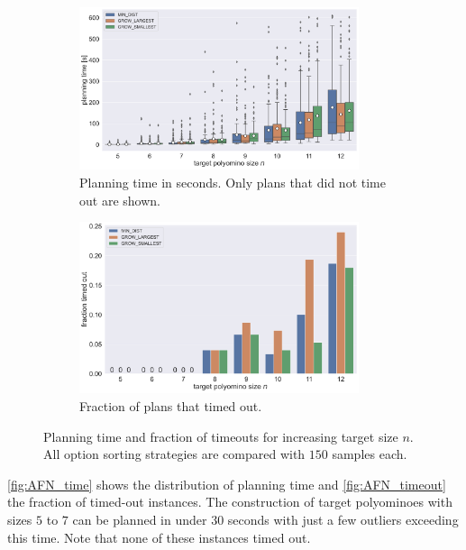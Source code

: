 \begin{figure}
	\centering
	\begin{subfigure}[b]{\textwidth}
		\centering
		\includegraphics[width=0.9\textwidth]{figures/plots/AFN_time.pdf}
		\caption{Planning time in seconds. Only plans that did not time out are shown.}
		\label{fig:AFN_time}
	\end{subfigure}

	\begin{subfigure}[b]{\textwidth}
		\centering
		\includegraphics[width=0.9\textwidth]{figures/plots/AFN_timeout.pdf}
		\caption{Fraction of plans that timed out.}
		\label{fig:AFN_timeout}
	\end{subfigure}
	\caption[Planning time and fraction of timeouts for increasing target size]{Planning time and fraction of timeouts for increasing target size $n$. All option sorting strategies are compared with $150$ samples each.}
	\label{fig:AFN_timestats}
\end{figure}

\autoref{fig:AFN_time} shows the distribution of planning time and \autoref{fig:AFN_timeout} the fraction of timed-out instances.
The construction of target polyominoes with sizes $5$ to $7$ can be planned in under $30$ seconds with just a few outliers exceeding this time.
Note that none of these instances timed out.

